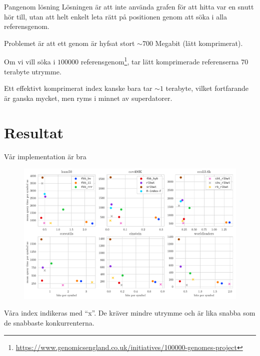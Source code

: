 \documentclass[11pt, aspectratio=169, table]{beamer}
\begin{document}
\begin{frame}{Pangenom lösning}
\setlength{\parskip}{\fill}
Lösningen är att inte använda grafen för att hitta var en snutt hör till, utan att helt 
enkelt leta rätt på positionen genom att söka i alla referensgenom.

Problemet är att ett genom är hyfsat stort $\sim 700$ Megabit (lätt komprimerat).

Om vi vill söka i $100000$ referensgenom\footnote{\url{https://www.genomicsengland.co.uk/initiatives/100000-genomes-project}}, 
tar lätt komprimerade referenserna $70$ terabyte utrymme.

Ett effektivt komprimerat index kanske bara tar $\sim 1$ terabyte, vilket fortfarande är ganska mycket, 
men ryms i minnet av superdatorer.
\end{frame}

\section{Resultat}
\begin{frame}{Vår implementation är bra}
\begin{figure}
\centering
\includegraphics[trim={0 8cm 0 0},clip,width=\textwidth]{amd_pattern_count_30.pdf}
\end{figure}

Våra index indikeras med ``x''. De kräver mindre utrymme och är lika snabba som de snabbaste konkurrenterna.
\end{frame}

%
\end{document}
